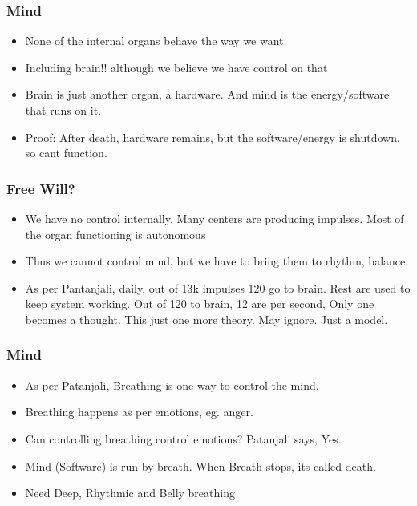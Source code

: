 \begin{frame}[fragile]
\frametitle{Mind}
\begin{itemize}
\item None of the internal organs behave the way we want. 
\item Including brain!! although we believe we have control on that
\item Brain is just another organ, a hardware. And mind is the energy/software that runs on it.
\item Proof: After death, hardware remains, but the software/energy is shutdown, so cant function.
\end{itemize}
\end{frame}



\begin{frame}[fragile]
\frametitle{Free Will?}

\begin{itemize}
\item We have no control internally. Many centers are producing impulses. Most of the organ functioning is autonomous
\item Thus we cannot control mind, but we have to bring them to rhythm, balance.
\item As per Pantanjali, daily, out of 13k impulses 120 go to brain. Rest are used to keep system working. Out of 120 to brain, 12 are per second, Only one becomes a thought. This just one more theory. May ignore. Just a model.
\end{itemize}
\end{frame}

\begin{frame}[fragile]
\frametitle{Mind}
\begin{itemize}
\item As per Patanjali, Breathing is one way to control the mind.
\item Breathing happens as per emotions, eg. anger.
\item Can controlling breathing control emotions? Patanjali says, Yes.
\item Mind (Software) is run by breath. When Breath stops, its called death.
\item Need Deep, Rhythmic and Belly breathing
\end{itemize}
\end{frame}


